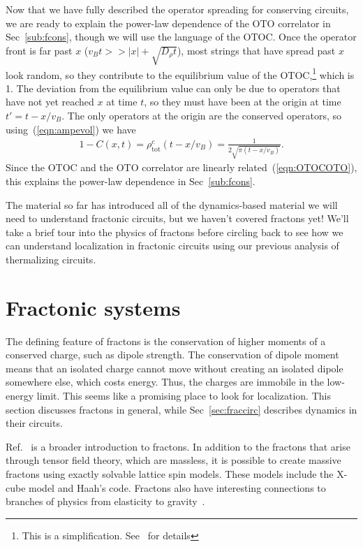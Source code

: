 \documentclass[a4paper,11pt]{article}
\renewcommand{\th}[1]{\frac{1}{#1}}
\newcommand{\abs}[1]{\left| #1 \right|}
\newcommand{\tot}{\text{tot}}
\begin{document}
Now that we have fully described the operator spreading for conserving circuits, we are ready to explain the power-law dependence of the OTO correlator in Sec~\ref{sub:fcons}, though we will use the language of the OTOC.
Once the operator front is far past $x$ ($v_Bt>>\abs{x}+\sqrt{D_\rho t}$), most strings that have spread past $x$ look random, so they contribute to the equilibrium value of the OTOC,\footnote{This is a simplification. See~\cite{KhemaniOpSp} for details} which is 1. The deviation from the equilibrium value can only be due to operators that have not yet reached $x$ at time $t$, so they must have been at the origin at time $t'=t-x/v_B$. The only operators at the origin are the conserved operators, so using~(\ref{eqn:ampevol}) we have
\begin{align}
1-C(x,t) = \rho^c_\tot(t-x/v_B) = \th{2\sqrt{\pi(t-x/v_B)}}.
\end{align}
Since the OTOC and the OTO correlator are linearly related~(\ref{eqn:OTOCOTO}), this explains the power-law dependence in Sec~\ref{sub:fcons}.

The material so far has introduced all of the dynamics-based material we will need to understand fractonic circuits, but we haven't covered fractons yet! We'll take a brief tour into the physics of fractons before circling back to see how we can understand localization in fractonic circuits using our previous analysis of thermalizing circuits.


\section{Fractonic systems} \label{sec:frac}

The defining feature of fractons is the conservation of higher moments of a conserved charge, such as dipole strength. The conservation of dipole moment means that an isolated charge cannot move without creating an isolated dipole somewhere else, which costs energy. Thus, the charges are immobile in the low-energy limit. This seems like a promising place to look for localization. This section discusses fractons in general, while Sec~\ref{sec:fraccirc} describes dynamics in their circuits.

Ref.~\cite{NandkishoreFractons} is a broader introduction to fractons. In addition to the fractons that arise through tensor field theory, which are massless, it is possible to create massive fractons using exactly solvable lattice spin models. These models include the X-cube model and Haah's code. Fractons also have interesting connections to branches of physics from elasticity to gravity~\cite{PretkoElasticity, PretkoGravity}.
\end{document}
